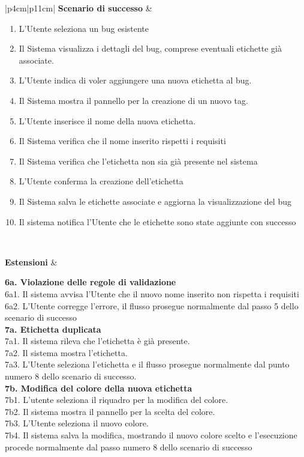\begin{longtable}{|p{4cm}|p{11cm}|}
\textbf{Scenario di successo} &
\begin{minipage}[t]{\linewidth}\raggedright
\begin{enumerate}[leftmargin=*,nosep]
\item L'Utente seleziona un bug esistente
\item Il Sistema visualizza i dettagli del bug, comprese eventuali etichette già associate. 
\item L'Utente indica di voler aggiungere una nuova etichetta al bug. 
\item Il Sistema mostra il pannello per la creazione di un nuovo tag. 
\item L'Utente inserisce il nome della nuova etichetta. 
\item Il Sistema verifica che il nome inserito rispetti i requisiti
\item Il Sistema verifica che l'etichetta non sia già presente nel sistema
\item L'Utente conferma la creazione dell'etichetta
\item Il Sistema salva le etichette associate e aggiorna la visualizzazione del bug
\item Il sistema notifica l'Utente che le etichette sono state aggiunte con successo
\end{enumerate}
\end{minipage} \\ \hline

\textbf{Estensioni} &
\begin{minipage}[t]{\linewidth}\raggedright
\textbf{6a. Violazione delle regole di validazione}\\
6a1. Il sistema avvisa l'Utente che il nuovo nome inserito non rispetta i requisiti\\
6a2. L'Utente corregge l'errore, il flusso prosegue normalmente dal passo 5 dello scenario di successo\\[0.6em]

\textbf{7a. Etichetta duplicata}\\
7a1. Il sistema rileva che l'etichetta è già presente.\\
7a2. Il sistema mostra l'etichetta.\\
7a3. L'Utente seleziona l'etichetta e il flusso prosegue normalmente dal punto numero 8 dello scenario di successo. \\[0.6em]

\textbf{7b. Modifica del colore della nuova etichetta}\\
7b1. L'utente seleziona il riquadro per la modifica del colore.\\
7b2. Il sistema mostra il pannello per la scelta del colore.\\
7b3. L'Utente seleziona il nuovo colore.\\
7b4. Il sistema salva la modifica, mostrando il nuovo colore scelto e l'esecuzione procede normalmente dal passo numero 8 dello scenario di successo
\\[0.6em]


\end{minipage}
\end{longtable}
